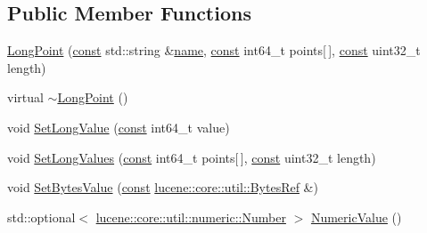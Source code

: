 \subsection*{Public Member Functions}
\begin{DoxyCompactItemize}
\item 
\mbox{\hyperlink{classlucene_1_1core_1_1document_1_1LongPoint_afafac70472560f4063bc11afe18be5c7}{Long\+Point}} (\mbox{\hyperlink{ZlibCrc32_8h_a2c212835823e3c54a8ab6d95c652660e}{const}} std\+::string \&\mbox{\hyperlink{classlucene_1_1core_1_1document_1_1Field_a52f673f3b3abb14b180f5159f4726537}{name}}, \mbox{\hyperlink{ZlibCrc32_8h_a2c212835823e3c54a8ab6d95c652660e}{const}} int64\+\_\+t points\mbox{[}$\,$\mbox{]}, \mbox{\hyperlink{ZlibCrc32_8h_a2c212835823e3c54a8ab6d95c652660e}{const}} uint32\+\_\+t length)
\item 
virtual \mbox{\hyperlink{classlucene_1_1core_1_1document_1_1LongPoint_ab2c1cbcab4d27060d84d7439b80b2dd7}{$\sim$\+Long\+Point}} ()
\item 
void \mbox{\hyperlink{classlucene_1_1core_1_1document_1_1LongPoint_a5bc668dfdf190b8bc0a52808a6580b40}{Set\+Long\+Value}} (\mbox{\hyperlink{ZlibCrc32_8h_a2c212835823e3c54a8ab6d95c652660e}{const}} int64\+\_\+t value)
\item 
void \mbox{\hyperlink{classlucene_1_1core_1_1document_1_1LongPoint_a8561762cd09cae0222620709406e3ba2}{Set\+Long\+Values}} (\mbox{\hyperlink{ZlibCrc32_8h_a2c212835823e3c54a8ab6d95c652660e}{const}} int64\+\_\+t points\mbox{[}$\,$\mbox{]}, \mbox{\hyperlink{ZlibCrc32_8h_a2c212835823e3c54a8ab6d95c652660e}{const}} uint32\+\_\+t length)
\item 
void \mbox{\hyperlink{classlucene_1_1core_1_1document_1_1LongPoint_a3ba17f0b827e583a9b568e368dd798ac}{Set\+Bytes\+Value}} (\mbox{\hyperlink{ZlibCrc32_8h_a2c212835823e3c54a8ab6d95c652660e}{const}} \mbox{\hyperlink{classlucene_1_1core_1_1util_1_1BytesRef}{lucene\+::core\+::util\+::\+Bytes\+Ref}} \&)
\item 
std\+::optional$<$ \mbox{\hyperlink{classlucene_1_1core_1_1util_1_1numeric_1_1Number}{lucene\+::core\+::util\+::numeric\+::\+Number}} $>$ \mbox{\hyperlink{classlucene_1_1core_1_1document_1_1LongPoint_a24068a492dbb14946de8de3bde3bd87b}{Numeric\+Value}} ()
\end{DoxyCompactItemize}
